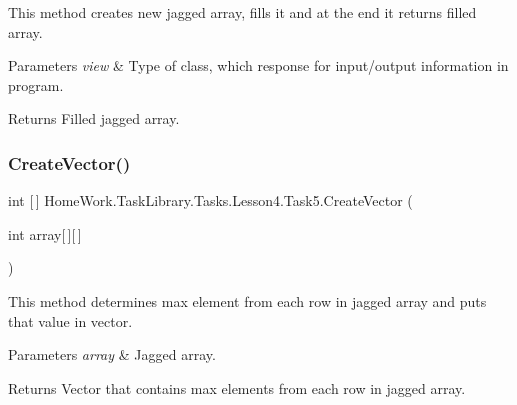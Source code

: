 This method creates new jagged array, fills it and at the end it returns filled array. 


\begin{DoxyParams}{Parameters}
{\em view} & Type of class, which response for input/output information in program.\\
\hline
\end{DoxyParams}
\begin{DoxyReturn}{Returns}
Filled jagged array.
\end{DoxyReturn}
\mbox{\label{class_home_work_1_1_task_library_1_1_tasks_1_1_lesson4_1_1_task5_a2133db8f54bc719bf9afeb67144d8ba2}} 
\subsubsection{\texorpdfstring{CreateVector()}{CreateVector()}}
{\footnotesize\ttfamily int \mbox{[}$\,$\mbox{]} Home\+Work.\+Task\+Library.\+Tasks.\+Lesson4.\+Task5.\+Create\+Vector (\begin{DoxyParamCaption}\item[{int}]{array\mbox{[}$\,$\mbox{]}\mbox{[}$\,$\mbox{]} }\end{DoxyParamCaption})\hspace{0.3cm}{\ttfamily [private]}}



This method determines max element from each row in jagged array and puts that value in vector. 


\begin{DoxyParams}{Parameters}
{\em array} & Jagged array.\\
\hline
\end{DoxyParams}
\begin{DoxyReturn}{Returns}
Vector that contains max elements from each row in jagged array.
\end{DoxyReturn}
\mbox{\label{class_home_work_1_1_task_library_1_1_tasks_1_1_lesson4_1_1_task5_aaed92b4acc1e6396624144c1fc9c3031}} 
